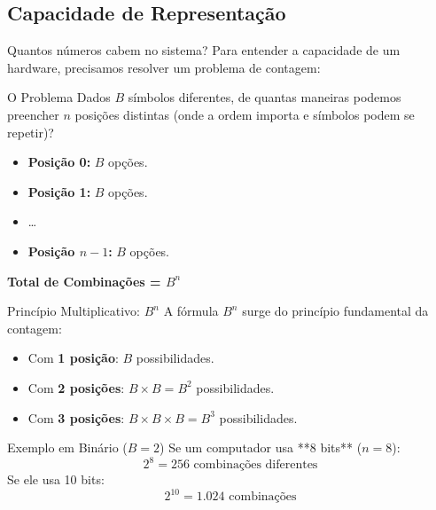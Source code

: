 \subsection{Capacidade de Representação}

\begin{frame}{Quantos números cabem no sistema?}
    Para entender a capacidade de um hardware, precisamos resolver um problema de contagem:

    \begin{exampleblock}{O Problema}
        Dados $B$ símbolos diferentes, de quantas maneiras podemos preencher $n$ posições distintas (onde a ordem importa e símbolos podem se repetir)?
    \end{exampleblock}

    \begin{itemize}
        \item \textbf{Posição 0:} $B$ opções.
        \item \textbf{Posição 1:} $B$ opções.
        \item \dots
        \item \textbf{Posição $n-1$:} $B$ opções.
    \end{itemize}

    \begin{center}
        \Large \textbf{Total de Combinações = $B^n$}
    \end{center}
\end{frame}

\begin{frame}{Princípio Multiplicativo: $B^n$}
    A fórmula $B^n$ surge do princípio fundamental da contagem:

    \begin{itemize}
        \item Com \textbf{1 posição}: $B$ possibilidades.
        \item Com \textbf{2 posições}: $B \times B = B^2$ possibilidades.
        \item Com \textbf{3 posições}: $B \times B \times B = B^3$ possibilidades.
    \end{itemize}



    \begin{block}{Exemplo em Binário ($B=2$)}
        Se um computador usa **8 bits** ($n=8$):
        $$ 2^8 = 256 \text{ combinações diferentes} $$
        Se ele usa 10 bits:
        $$ 2^{10} = 1.024 \text{ combinações} $$
    \end{block}
\end{frame}

